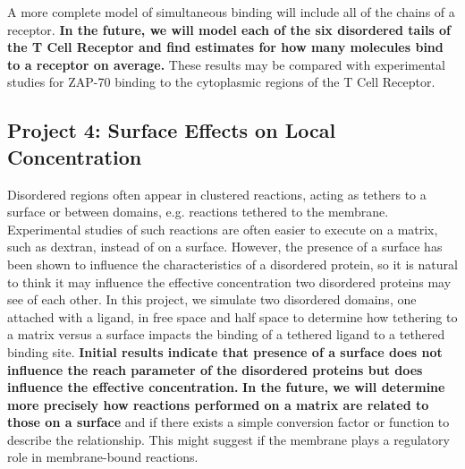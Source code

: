 \documentclass[onecolumn]{article}
\begin{document}
A more complete model of simultaneous binding will include all of the chains of a receptor. \textbf{In the future, we will model each of the six disordered tails of the T Cell Receptor and find estimates for how many molecules bind to a receptor on average.} These results may be compared with experimental studies for ZAP-70 binding to the cytoplasmic regions of the T Cell Receptor.

\subsection*{Project 4: Surface Effects on Local Concentration}

Disordered regions often appear in clustered reactions, acting as tethers to a surface or between domains, e.g. reactions tethered to the membrane. Experimental studies of such reactions are often easier to execute on a matrix, such as dextran, instead of on a surface. However, the presence of a surface has been shown to influence the characteristics of a disordered protein, so it is natural to think it may influence the effective concentration two disordered proteins may see of each other. In this project, we simulate two disordered domains, one attached with a ligand, in free space and half space to determine how tethering to a matrix versus a surface impacts the binding of a tethered ligand to a tethered binding site. \textbf{Initial results indicate that presence of a surface does not influence the reach parameter of the disordered proteins but does influence the effective concentration.} \textbf{In the future, we will determine more precisely how reactions performed on a matrix are related to those on a surface} and if there exists a simple conversion factor or function to describe the relationship. This might suggest if the membrane plays a regulatory role in membrane-bound reactions.






\end{document}
